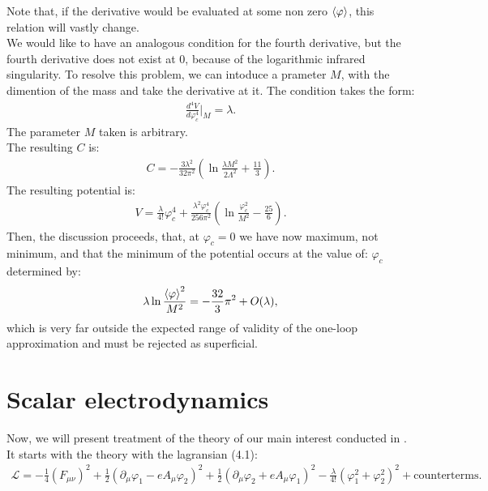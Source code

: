 Note that, if the derivative would be evaluated at some non zero ${\langle\varphi\rangle}$, this relation will 
vastly change. \\
We would like to have an analogous condition for the fourth derivative, but
 the fourth derivative does not exist at 0, because of the logarithmic infrared singularity.
To resolve this problem, we can intoduce a prameter $M$, with the dimention of the mass and take 
the derivative at it.
The condition takes the form:
\begin{align}
\frac{d^4V}{d\varphi_c^4}\Big|_M=\lambda.
\end{align}
The parameter $M$ taken is arbitrary. \\
The resulting $C$ is:
\begin{align}
C=-\frac{3\lambda^2}{32\pi^2}\left(\ln\frac{\lambda M^2}{2\Lambda^2}+\frac{11}{3}\right).
\end{align}
The resulting potential is:
\begin{align}
V=\frac{\lambda}{4!}\varphi_c^4+\frac{\lambda^2\varphi_c^4}{256\pi^2}\left(\ln
\frac{\varphi_c^2}{M^2}-\frac{25}{6}\right).
\end{align}
Then, the discussion proceeds, that, at $\varphi_c = 0$ we have now maximum, not minimum, 
and that the minimum of the potential occurs at the value of: 
$\varphi_c$ determined by:
\begin{align}
\lambda\ln\frac{{\langle\varphi\rangle}^2}{M^2}=-\frac{32}{3}\pi^2+O(\lambda),
\end{align}
which is very far outside the expected range of validity of the one-loop approximation and must be 
rejected as superficial. \\
\section{Scalar electrodynamics}
Now, we will present treatment of the theory of our main interest conducted in 
\cite{Coleman1973}. \\
It starts with the theory with the lagransian \cite{Coleman1973}(4.1):
\begin{align}\label{CW_electrodynamics}
\mathcal{L} = -\frac{1}{4}(F_{\mu\nu})^2+\frac{1}{2}(\partial_\mu\varphi_1-eA_\mu\varphi_2)^2 + 
\frac{1}{2}(\partial_\mu\varphi_2+eA_\mu\varphi_1)^2-\frac{\lambda}{4!}(\varphi_1^2+\varphi_2^2)^2 
 + \textrm{counterterms}.
\end{align}

